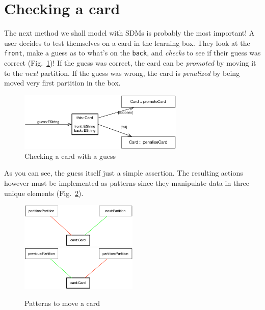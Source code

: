 \newpage
\section{Checking a card}
\genHeader
\hypertarget{sec:checkCard}{}

The next method we shall model with SDMs is probably the most important! A user decides to test themselves on a card in the learning box. They look at the
\texttt{front}, make a guess as to what's on the \texttt{back}, and \emph{checks} to see if their guess was correct (Fig.~\ref{fig:goal_check})! If the guess
was correct, the card can be \emph{promoted} by moving it to the \emph{next} partition. If the guess was wrong, the card is \emph{penalized} by being moved
very first partition in the box.

\begin{figure}[htbp]
 	\centering
   \includegraphics[width=0.7\textwidth]{checkCard_main.pdf}
 	\caption{Checking a card with a guess}
 	\label{fig:goal_check}
\end{figure}
\FloatBarrier

As you can see, the guess itself just a simple assertion. The resulting actions however must be implemented as patterns since they manipulate data in three
unique elements (Fig.~\ref{fig:patterns_check}).

\begin{figure}[htbp]
 	\centering
   \includegraphics[width=0.5\textwidth]{checkCard_promote.pdf}
   \\ \vspace{1cm}
    \includegraphics[width=0.5\textwidth]{checkCard_penalize.pdf}
 	\caption{Patterns to move a card}
 	\label{fig:patterns_check}
\end{figure}
\FloatBarrier

